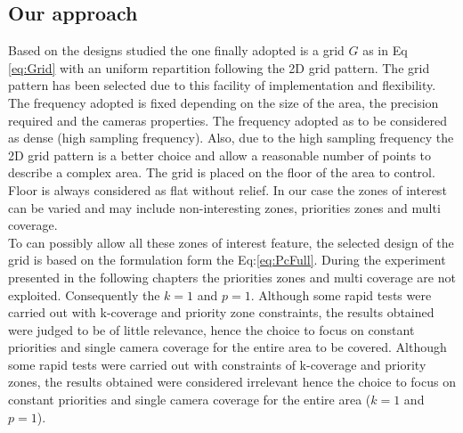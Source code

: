 \begin{landscape}
\begin{table}[!h]
 \caption{Sum-up of the grid map.}\label{tab:mapSumUp}
\end{table}	
\end{landscape}
 
\subsection{Our approach}
 Based on the designs  studied the one finally adopted is a grid $G$ as in Eq \ref{eq:Grid} with an uniform repartition following the 2D grid pattern. The grid pattern has been selected due to this facility of implementation and  flexibility.
  The frequency adopted is fixed depending on the size of the area, the precision required and the cameras properties. The frequency adopted as to be considered as dense (high sampling frequency).
  Also, due to the high sampling frequency the 2D grid pattern is a better choice and allow a reasonable number of points to describe a complex area. 
  The grid is placed on the floor of the area to control. Floor is always considered as flat without relief.
  In our case the zones of interest can be varied and may include non-interesting zones, priorities zones  and  multi coverage. \\
  To can possibly allow all these zones of interest feature, the selected design of the grid is based on the formulation form the Eq:\ref{eq:PcFull}. During the experiment presented in the following  chapters the priorities zones and multi coverage are not exploited. Consequently the $k=1$ and $p=1$.  Although some rapid tests were carried out with k-coverage and priority zone constraints, the results obtained were judged to be of little relevance, hence the choice to focus on constant priorities and single camera coverage for the entire area to be covered.
 Although some rapid tests were carried out with constraints of k-coverage and priority zones, the results obtained were considered irrelevant hence the choice to focus on constant priorities and single camera coverage for the entire area ($k=1$ and $p=1$).

